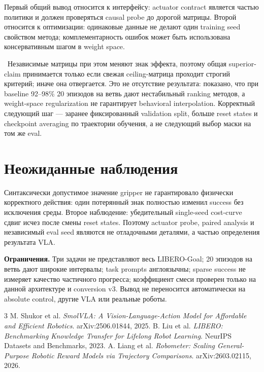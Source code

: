 \documentclass[10pt,twocolumn]{article}
\begin{document}
Первый общий вывод относится к интерфейсу: actuator contract является частью политики и должен
проверяться causal probe до дорогой матрицы. Второй относится к оптимизации: одинаковые данные не
делают один training seed свойством метода; комплементарность ошибок может быть
использована консервативным шагом в weight space.

\CeilingSummary\ \CeilingVerdict Независимые матрицы при этом меняют знак эффекта, поэтому общая
superior-claim принимается только если свежая ceiling-матрица проходит строгий критерий; иначе она
отвергается. Это не отсутствие результата:
показано, что при baseline 92--98\% 20 эпизодов на ветвь дают нестабильный ranking методов, а
weight-space regularization не гарантирует behavioral interpolation. Корректный следующий шаг ---
заранее фиксированный validation split, больше reset states и checkpoint averaging по траектории
обучения, а не следующий выбор маски на том же eval.

\section{Неожиданные наблюдения}

Синтаксически допустимое значение gripper не гарантировало физически корректного действия: один
потерянный знак полностью изменил success без исключения среды. Второе наблюдение: убедительный
single-seed cost-curve сдвиг исчез после смены reset states. Поэтому actuator probe, paired analysis
и независимый eval seed являются не отладочными деталями, а частью определения результата VLA.

\textbf{Ограничения.} Три задачи не представляют весь LIBERO-Goal; 20 эпизодов на ветвь дают широкие
интервалы; task prompts англоязычны; sparse success не измеряет качество частичного прогресса;
коэффициент смеси проверен только на данной архитектуре и conversion v3. Вывод не переносится
автоматически на absolute control, другие VLA или реальные роботы.

\begin{thebibliography}{3}\footnotesize
{} M. Shukor et al. \emph{SmolVLA: A Vision-Language-Action Model for Affordable and
Efficient Robotics}. arXiv:2506.01844, 2025.
 B. Liu et al. \emph{LIBERO: Benchmarking Knowledge Transfer for Lifelong Robot
Learning}. NeurIPS Datasets and Benchmarks, 2023.
 A. Liang et al. \emph{Robometer: Scaling General-Purpose Robotic Reward Models via
Trajectory Comparisons}. arXiv:2603.02115, 2026.
\end{thebibliography}
\end{document}
